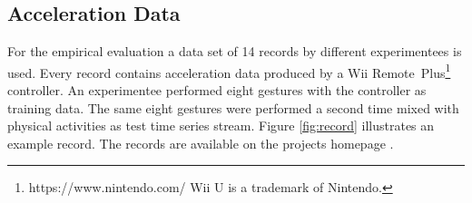 \subsection{Acceleration Data} \label{acceleration_data}

For the empirical evaluation a data set of 14 records by different experimentees is used. Every record contains
acceleration data produced by a Wii
Remote\texttrademark~Plus\footnote{https://www.nintendo.com/ Wii U is a trademark of Nintendo.} controller. An
experimentee performed eight gestures with the controller as training data. The same eight gestures were performed a
second time mixed with physical activities as test time series stream. Figure \ref{fig:record} illustrates an example
record. The records are available on the projects
homepage \cite{lesti2017filter}.

